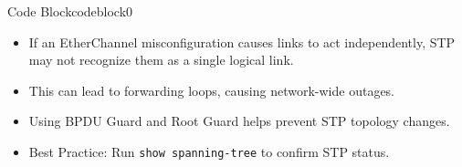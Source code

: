 \documentclass[a4paper]{article}
\begin{document}
\begin{enumerate}
\begin{ocg}{Code Block}{codeblock}{0}
		      \vspace{0.5cm}
		      \begin{tcolorbox}
			      \begin{itemize}
				      \item If an EtherChannel misconfiguration causes links to act independently, STP may not recognize them as a single logical link.
				      \item This can lead to forwarding loops, causing network-wide outages.
				      \item Using BPDU Guard and Root Guard helps prevent STP topology changes.
			      \end{itemize}
		      \end{tcolorbox}

		      \begin{itemize}
			      \item \small Best Practice: Run \texttt{show spanning-tree} to confirm STP status.
		      \end{itemize}
	      \end{ocg}


\end{enumerate}
\end{document}
